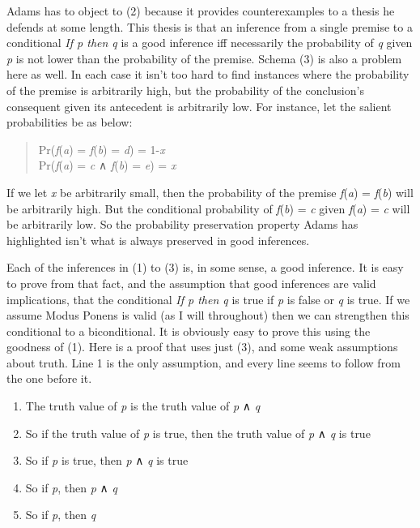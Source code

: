 \documentclass[
  11pt,
  letterpaper,
  DIV=11,
  numbers=noendperiod,
  twoside]{scrartcl}
\providecommand{\tightlist}{%
  \setlength{\itemsep}{0pt}\setlength{\parskip}{0pt}}
\begin{document}
Adams has to object to (2) because it provides counterexamples to a
thesis he defends at some length. This thesis is that an inference from
a single premise to a conditional \emph{If p then q} is a good inference
iff necessarily the probability of \emph{q} given \emph{p} is not lower
than the probability of the premise. Schema (3) is also a problem here
as well. In each case it isn't too hard to find instances where the
probability of the premise is arbitrarily high, but the probability of
the conclusion's consequent given its antecedent is arbitrarily low. For
instance, let the salient probabilities be as below:

\begin{quote}
Pr(\emph{f}(\emph{a}) = \emph{f}(\emph{b}) = \emph{d}) = 1-\emph{x}\\
Pr(\emph{f}(\emph{a}) = \emph{c} ∧ \emph{f}(\emph{b}) = \emph{e}) =
\emph{x}
\end{quote}

If we let \emph{x} be arbitrarily small, then the probability of the
premise \emph{f}(\emph{a}) = \emph{f}(\emph{b}) will be arbitrarily
high. But the conditional probability of \emph{f}(\emph{b}) = \emph{c}
given \emph{f}(\emph{a}) = \emph{c} will be arbitrarily low. So the
probability preservation property Adams has highlighted isn't what is
always preserved in good inferences.

Each of the inferences in (1) to (3) is, in some sense, a good
inference. It is easy to prove from that fact, and the assumption that
good inferences are valid implications, that the conditional \emph{If p
then q} is true if \emph{p} is false or \emph{q} is true. If we assume
Modus Ponens is valid (as I will throughout) then we can strengthen this
conditional to a biconditional. It is obviously easy to prove this using
the goodness of (1). Here is a proof that uses just (3), and some weak
assumptions about truth. Line 1 is the only assumption, and every line
seems to follow from the one before it.

\begin{enumerate}
\def\labelenumi{\arabic{enumi}.}
\tightlist
\item
  The truth value of \emph{p} is the truth value of \emph{p} ∧ \emph{q}
\item
  So if the truth value of \emph{p} is true, then the truth value of
  \emph{p} ∧ \emph{q} is true
\item
  So if \emph{p} is true, then \emph{p} ∧ \emph{q} is true
\item
  So if \emph{p}, then \emph{p} ∧ \emph{q}
\item
  So if \emph{p}, then \emph{q}
\end{enumerate}
\end{document}
